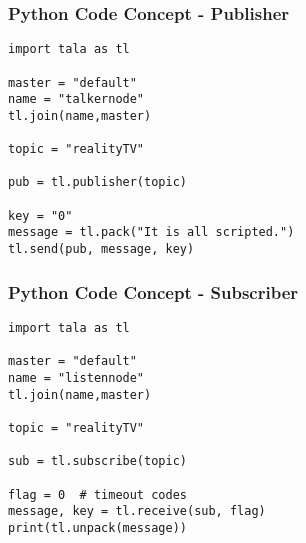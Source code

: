 \documentclass[xcolor=svgnames]{beamer}
\begin{document}
\begin{frame}[fragile]
  \frametitle{Python Code Concept - Publisher}
\begin{verbatim}
import tala as tl

master = "default"
name = "talkernode"
tl.join(name,master)

topic = "realityTV"

pub = tl.publisher(topic)

key = "0"
message = tl.pack("It is all scripted.")
tl.send(pub, message, key)

\end{verbatim}
\end{frame}



\begin{frame}[fragile]
  \frametitle{Python Code Concept - Subscriber}
\begin{verbatim}
import tala as tl

master = "default"
name = "listennode"
tl.join(name,master)

topic = "realityTV"

sub = tl.subscribe(topic)

flag = 0  # timeout codes
message, key = tl.receive(sub, flag)
print(tl.unpack(message))

\end{verbatim}
\end{frame}


\end{document}
